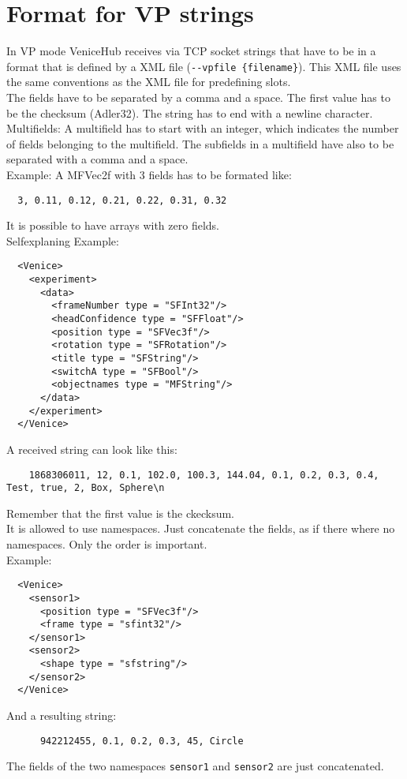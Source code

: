 \documentclass[german,a4paper]{article}
\begin{document}
\section{Format for VP strings}
\label{sec:VPstring}
In VP mode VeniceHub receives via TCP socket strings that have to be in a format that is defined by a XML file (\texttt{-\--vpfile \{filename\}}). This XML file uses the same conventions as the XML file for predefining slots.\\
The fields have to be separated by a comma and a space. The first value has to be the checksum (Adler32). The string has to end with a newline character.\\
Multifields: A multifield has to start with an integer, which indicates the number of fields belonging to the multifield. The subfields in a multifield have also to be separated with a comma and a space.\\
Example: A MFVec2f with 3 fields has to be formated like:
\begin{lstlisting}
  3, 0.11, 0.12, 0.21, 0.22, 0.31, 0.32
\end{lstlisting}
It is possible to have arrays with zero fields.\\
Selfexplaning Example:
\begin{lstlisting}
  <Venice>
    <experiment>
      <data>
        <frameNumber type = "SFInt32"/>
        <headConfidence type = "SFFloat"/>
        <position type = "SFVec3f"/>
        <rotation type = "SFRotation"/>
        <title type = "SFString"/>
        <switchA type = "SFBool"/>
        <objectnames type = "MFString"/>
      </data>
    </experiment>
  </Venice>
\end{lstlisting}

A received string can look like this:
\begin{lstlisting}
	1868306011, 12, 0.1, 102.0, 100.3, 144.04, 0.1, 0.2, 0.3, 0.4, Test, true, 2, Box, Sphere\n
\end{lstlisting}
Remember that the first value is the ckecksum.\\

It is allowed to use namespaces. Just concatenate the fields, as if there where no namespaces. Only the order is important.\\
Example:
\begin{lstlisting}
  <Venice>
    <sensor1>
      <position type = "SFVec3f"/>
      <frame type = "sfint32"/>
    </sensor1>
    <sensor2>
      <shape type = "sfstring"/>
    </sensor2>
  </Venice>
\end{lstlisting}
And a resulting string:
\begin{lstlisting}
      942212455, 0.1, 0.2, 0.3, 45, Circle
\end{lstlisting}
The fields of the two namespaces \texttt{sensor1} and \texttt{sensor2} are just concatenated.
\end{document}
